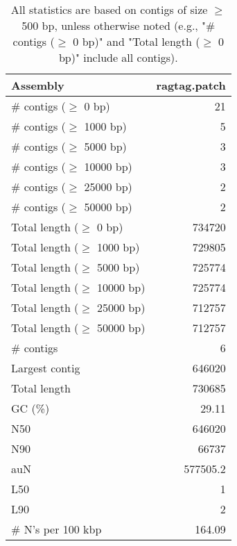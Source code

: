 \documentclass[12pt,a4paper]{article}
\begin{document}
\begin{table}[ht]
\begin{center}
\caption{All statistics are based on contigs of size $\geq$ 500 bp, unless otherwise noted (e.g., "\# contigs ($\geq$ 0 bp)" and "Total length ($\geq$ 0 bp)" include all contigs).}
\begin{tabular}{|l*{1}{|r}|}
\hline
Assembly & ragtag.patch \\ \hline
\# contigs ($\geq$ 0 bp) & 21 \\ \hline
\# contigs ($\geq$ 1000 bp) & 5 \\ \hline
\# contigs ($\geq$ 5000 bp) & 3 \\ \hline
\# contigs ($\geq$ 10000 bp) & 3 \\ \hline
\# contigs ($\geq$ 25000 bp) & 2 \\ \hline
\# contigs ($\geq$ 50000 bp) & 2 \\ \hline
Total length ($\geq$ 0 bp) & 734720 \\ \hline
Total length ($\geq$ 1000 bp) & 729805 \\ \hline
Total length ($\geq$ 5000 bp) & 725774 \\ \hline
Total length ($\geq$ 10000 bp) & 725774 \\ \hline
Total length ($\geq$ 25000 bp) & 712757 \\ \hline
Total length ($\geq$ 50000 bp) & 712757 \\ \hline
\# contigs & 6 \\ \hline
Largest contig & 646020 \\ \hline
Total length & 730685 \\ \hline
GC (\%) & 29.11 \\ \hline
N50 & 646020 \\ \hline
N90 & 66737 \\ \hline
auN & 577505.2 \\ \hline
L50 & 1 \\ \hline
L90 & 2 \\ \hline
\# N's per 100 kbp & 164.09 \\ \hline
\end{tabular}
\end{center}
\end{table}
\end{document}
